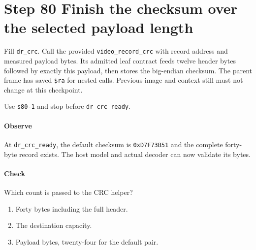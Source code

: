 \section{Step 80 Finish the checksum over the selected payload length}
Fill \texttt{dr\_crc}. Call the provided \texttt{video\_record\_crc} with record address and measured payload bytes. Its admitted leaf contract feeds twelve header bytes followed by exactly this payload, then stores the big-endian checksum. The parent frame has saved \texttt{\$ra} for nested calls. Previous image and context still must not change at this checkpoint.

Use \texttt{s80-1} and stop before \texttt{dr\_crc\_ready}.

\paragraph{Observe} At \texttt{dr\_crc\_ready}, the default checksum is \texttt{0xD7F73B51} and the complete forty-byte record exists. The host model and actual decoder can now validate its bytes.

\paragraph{Check} Which count is passed to the CRC helper?
\begin{enumerate}[label=\Alph*.]
  \item Forty bytes including the full header.
  \item The destination capacity.
  \item Payload bytes, twenty-four for the default pair.
\end{enumerate}
